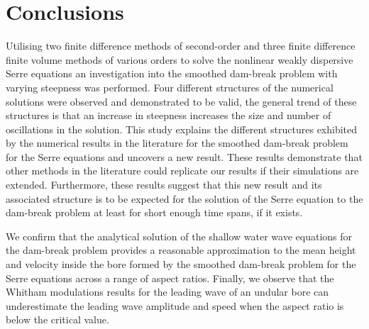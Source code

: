 \documentclass[times]{elsarticle}
\begin{document}
\section{Conclusions}
\label{section:Conclusions}
Utilising two finite difference methods of second-order and three finite difference finite volume methods of various orders to solve the nonlinear weakly dispersive Serre equations an investigation into the smoothed dam-break problem with varying steepness was performed. Four different structures of the numerical solutions were observed and demonstrated to be valid, the general trend of these structures is that an increase in steepness increases the size and number of oscillations in the solution. This study explains the different structures exhibited by the numerical results in the literature for the smoothed dam-break problem for the Serre equations and uncovers a new result. These results demonstrate that other methods in the literature could replicate our results if their simulations are extended. Furthermore, these results suggest that this new result and its associated structure is to be expected for the solution of the Serre equation to the dam-break problem at least for short enough time spans, if it exists.

We confirm that the analytical solution of the shallow water wave equations for the dam-break problem provides a reasonable approximation to the mean height and velocity inside the bore formed by the smoothed dam-break problem for the Serre equations across a range of aspect ratios. Finally, we observe that the Whitham modulations results for the leading wave of an undular bore can underestimate the leading wave amplitude and speed when the aspect ratio is below the critical value.
\end{document}
